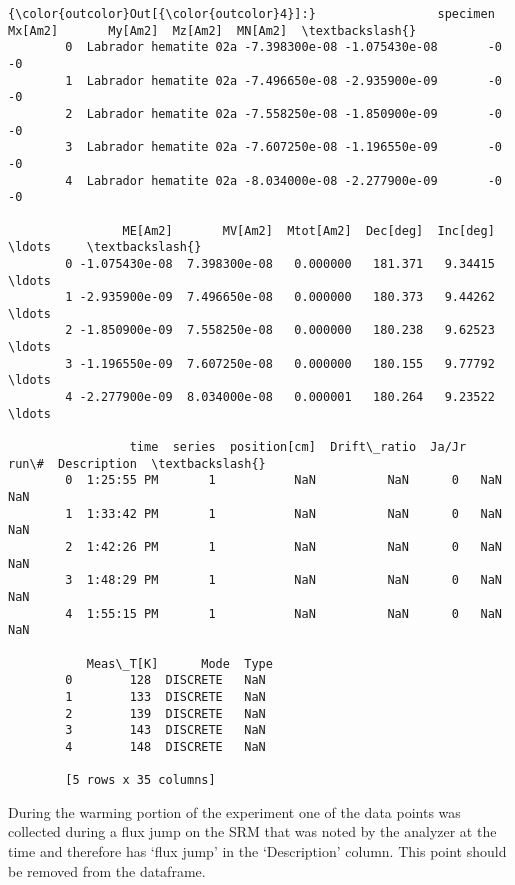 \documentclass{article}
\begin{document}
            \begin{Verbatim}[commandchars=\\\{\}]
{\color{outcolor}Out[{\color{outcolor}4}]:}                 specimen       Mx[Am2]       My[Am2]  Mz[Am2]  MN[Am2]  \textbackslash{}
        0  Labrador hematite 02a -7.398300e-08 -1.075430e-08       -0       -0   
        1  Labrador hematite 02a -7.496650e-08 -2.935900e-09       -0       -0   
        2  Labrador hematite 02a -7.558250e-08 -1.850900e-09       -0       -0   
        3  Labrador hematite 02a -7.607250e-08 -1.196550e-09       -0       -0   
        4  Labrador hematite 02a -8.034000e-08 -2.277900e-09       -0       -0   
        
                ME[Am2]       MV[Am2]  Mtot[Am2]  Dec[deg]  Inc[deg]    \ldots     \textbackslash{}
        0 -1.075430e-08  7.398300e-08   0.000000   181.371   9.34415    \ldots      
        1 -2.935900e-09  7.496650e-08   0.000000   180.373   9.44262    \ldots      
        2 -1.850900e-09  7.558250e-08   0.000000   180.238   9.62523    \ldots      
        3 -1.196550e-09  7.607250e-08   0.000000   180.155   9.77792    \ldots      
        4 -2.277900e-09  8.034000e-08   0.000001   180.264   9.23522    \ldots      
        
                 time  series  position[cm]  Drift\_ratio  Ja/Jr  run\#  Description  \textbackslash{}
        0  1:25:55 PM       1           NaN          NaN      0   NaN          NaN   
        1  1:33:42 PM       1           NaN          NaN      0   NaN          NaN   
        2  1:42:26 PM       1           NaN          NaN      0   NaN          NaN   
        3  1:48:29 PM       1           NaN          NaN      0   NaN          NaN   
        4  1:55:15 PM       1           NaN          NaN      0   NaN          NaN   
        
           Meas\_T[K]      Mode  Type  
        0        128  DISCRETE   NaN  
        1        133  DISCRETE   NaN  
        2        139  DISCRETE   NaN  
        3        143  DISCRETE   NaN  
        4        148  DISCRETE   NaN  
        
        [5 rows x 35 columns]
\end{Verbatim}
        
    During the warming portion of the experiment one of the data points was
collected during a flux jump on the SRM that was noted by the analyzer
at the time and therefore has `flux jump' in the `Description' column.
This point should be removed from the dataframe.
\end{document}
